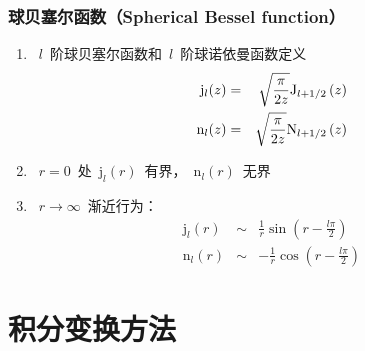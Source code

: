 \documentclass[12pt,a4paper]{article}
\renewcommand{\[}{\ $\displaystyle}
\renewcommand{\]}{$\ }%
\newcommand\mi{\mathrm{i}}
\newcommand\e{\mathrm{e}}
\newcommand{\summ}[2][n]{\sum_{#1=#2}^\infty}
\begin{document}
	   \subsubsection{球贝塞尔函数（Spherical Bessel function）}
	   \begin{enumerate}
	     \item \[l\]阶球贝塞尔函数和\[l\]阶球诺依曼函数定义
	     \begin{eqnarray*}
	       \mathrm j_l(z) &=& \sqrt{\frac \pi{2z}}\fj[l+1/2]{z}\\
	       \mathrm n_l(z) &=& \sqrt{\frac \pi{2z}}\fn[l+1/2]{z} \\
	    \end{eqnarray*}
	    \newcommand{\rj}{\mathrm j}
	    \newcommand{\rn}{\mathrm n}
		\item \[r=0\]处\[\rj_l(r)\]有界，\[\rn_l(r)\]无界
		\item \[r\to\infty\]渐近行为：
			\begin{eqnarray*}
			 \rj_l(r) &\sim & \frac{1}{r}\sin\left(r-\frac{l\pi}{2}\right)\\
			 \rn_l(r) &\sim & -\frac{1}{r}\cos\left(r-\frac{l\pi}{2}\right) 
			\end{eqnarray*}
	   \end{enumerate}
	   
\section{积分变换方法}
\end{document}
